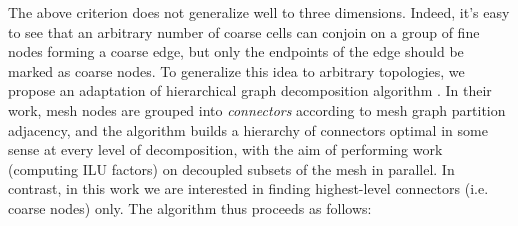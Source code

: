 The above criterion does not generalize well to three dimensions.   Indeed, it's easy to see that an arbitrary number of coarse cells can conjoin on a group of fine nodes forming a coarse edge, but only the endpoints of the edge should be marked as coarse nodes.   To generalize this idea to arbitrary topologies, we propose an adaptation of hierarchical graph decomposition algorithm \cite{Henon2006}.   In their work, mesh nodes are grouped into \textit{connectors} according to mesh graph partition adjacency, and the algorithm builds a hierarchy of connectors optimal in some sense at every level of decomposition, with the aim of performing work (computing ILU factors) on decoupled subsets of the mesh in parallel.   In contrast, in this work we are interested in finding highest-level connectors (i.e. coarse nodes) only.   The algorithm thus proceeds as follows:

